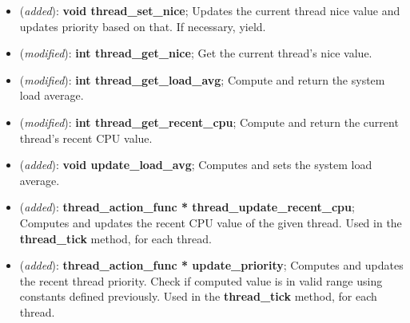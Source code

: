 \documentclass[11pt]{scrartcl}
\begin{document}
\begin{itemize}
    \item (\textit{added}): \textbf{void thread\_set\_nice};
    Updates the current thread nice value and updates priority based on that. If necessary, yield.
    
    \item (\textit{modified}): \textbf{int thread\_get\_nice};
    Get the current thread's nice value.
    
    \item (\textit{modified}): \textbf{int thread\_get\_load\_avg};
    Compute and return the system load average.
    
    \item (\textit{modified}): \textbf{int thread\_get\_recent\_cpu};
    Compute and return the current thread's recent CPU value.

    \item (\textit{added}): \textbf{void update\_load\_avg};
    Computes and sets the system load average.

    \item (\textit{added}): \textbf{thread\_action\_func * thread\_update\_recent\_cpu};
    Computes and updates the recent CPU value of the given thread. Used in the \textbf{thread\_tick} method, for each thread. 
    
    \item (\textit{added}): \textbf{thread\_action\_func * update\_priority};
    Computes and updates the recent thread priority. Check if computed value is in valid range using constants defined previously. Used in the \textbf{thread\_tick} method, for each thread.

\end{itemize}
\end{document}
